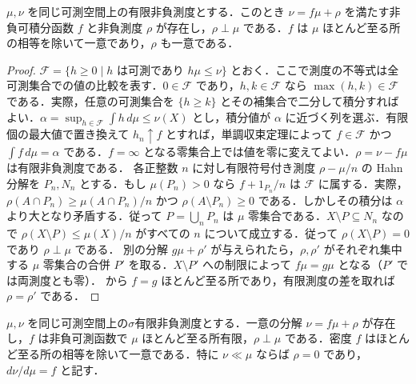 \begin{prop}[有限測度のLebesgue分解]
$\mu,\nu$ を同じ可測空間上の有限非負測度とする．このとき $\nu=f\mu+\rho$ を満たす非負可積分函数 $f$ と非負測度 $\rho$ が存在し，$\rho\perp\mu$ である．$f$ は $\mu$ ほとんど至る所の相等を除いて一意であり，$\rho$ も一意である．
\end{prop}
\begin{proof}
$\mathcal F=\{h\geq0\mid h\text{ は可測であり } h\mu\leq\nu\}$ とおく．ここで測度の不等式は全可測集合での値の比較を表す．$0\in\mathcal F$ であり，$h,k\in\mathcal F$ なら $\max(h,k)\in\mathcal F$ である．実際，任意の可測集合を $\{h\geq k\}$ とその補集合で二分して積分すればよい．$\alpha=\sup_{h\in\mathcal F}\int h\,d\mu\leq\nu(X)$ とし，積分値が $\alpha$ に近づく列を選ぶ．有限個の最大値で置き換えて $h_n\uparrow f$ とすれば，単調収束定理によって $f\in\mathcal F$ かつ $\int f\,d\mu=\alpha$ である．$f=\infty$ となる零集合上では値を零に変えてよい．$\rho=\nu-f\mu$ は有限非負測度である．
各正整数 $n$ に対し有限符号付き測度 $\rho-\mu/n$ の Hahn分解を $P_n,N_n$ とする．もし $\mu(P_n)>0$ なら $f+1_{P_n}/n$ は $\mathcal F$ に属する．実際，$\rho(A\cap P_n)\geq\mu(A\cap P_n)/n$ かつ $\rho(A\setminus P_n)\geq0$ である．しかしその積分は $\alpha$ より大となり矛盾する．従って $P=\bigcup_n P_n$ は $\mu$ 零集合である．$X\setminus P\subseteq N_n$ なので $\rho(X\setminus P)\leq\mu(X)/n$ がすべての $n$ について成立する．従って $\rho(X\setminus P)=0$ であり $\rho\perp\mu$ である．
別の分解 $g\mu+\rho'$ が与えられたら，$\rho,\rho'$ がそれぞれ集中する $\mu$ 零集合の合併 $P'$ を取る．$X\setminus P'$ への制限によって $f\mu=g\mu$ となる（$P'$ では両測度とも零）． から $f=g$ ほとんど至る所であり，有限測度の差を取れば $\rho=\rho'$ である．
\end{proof}
\begin{prop}
$\mu,\nu$ を同じ可測空間上の$\sigma$有限非負測度とする．一意の分解 $\nu=f\mu+\rho$ が存在し，$f$ は非負可測函数で $\mu$ ほとんど至る所有限，$\rho\perp\mu$ である．密度 $f$ はほとんど至る所の相等を除いて一意である．特に $\nu\ll\mu$ ならば $\rho=0$ であり，$d\nu/d\mu=f$ と記す．
\end{prop}
